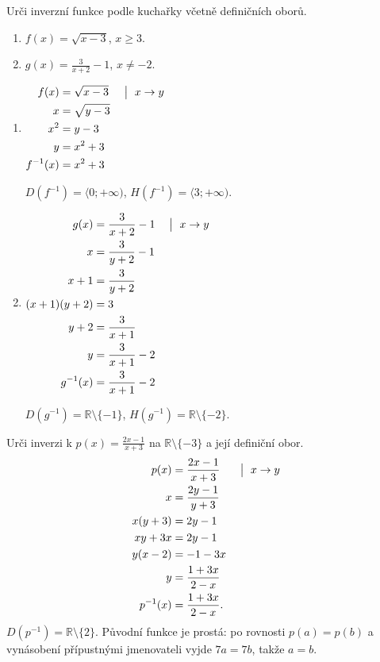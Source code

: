 \documentclass[11pt,a4paper]{article}
\begin{document}
\begin{zadaniReseniBox}[title={Samostatná práce 1}]
Urči inverzní funkce podle kuchařky včetně definičních oborů.
\begin{enumerate}[label=\alph*)]
\item $f(x)=\sqrt{x-3}$, $x\ge3$.
\item $g(x)=\frac{3}{x+2}-1$, $x\ne-2$.
\end{enumerate}
\tcblower
\begin{enumerate}[label=\alph*)]
\item
\(\displaystyle\begin{aligned}f(x)&=\sqrt{x-3} &&\bigm|\ x\to y\\x&=\sqrt{y-3}\\x^2&=y-3\\y&=x^2+3\\f^{-1}(x)&=x^2+3\end{aligned}\)

$D(f^{-1})=\langle0;+\infty)$, $H(f^{-1})=\langle3;+\infty)$.
\item
\(\displaystyle\begin{aligned}g(x)&=\frac{3}{x+2}-1 &&\bigm|\ x\to y\\x&=\frac{3}{y+2}-1\\x+1&=\frac{3}{y+2}\\(x+1)(y+2)&=3\\y+2&=\frac{3}{x+1}\\y&=\frac{3}{x+1}-2\\g^{-1}(x)&=\frac{3}{x+1}-2\end{aligned}\)

$D(g^{-1})=\mathbb R\setminus\{-1\}$, $H(g^{-1})=\mathbb R\setminus\{-2\}$.
\end{enumerate}
\end{zadaniReseniBox}

\begin{zadaniReseniBox}[title={Rozšíření 1}]
Urči inverzi k $p(x)=\frac{2x-1}{x+3}$ na $\mathbb R\setminus\{-3\}$ a její definiční obor.
\tcblower
\[
\begin{aligned}
p(x)&=\frac{2x-1}{x+3} &&\bigm|\ x\to y\\
x&=\frac{2y-1}{y+3}\\
x(y+3)&=2y-1\\
xy+3x&=2y-1\\
y(x-2)&=-1-3x\\
y&=\frac{1+3x}{2-x}\\
p^{-1}(x)&=\frac{1+3x}{2-x}.
\end{aligned}
\]
$D(p^{-1})=\mathbb R\setminus\{2\}$. Původní funkce je prostá: po rovnosti $p(a)=p(b)$ a vynásobení přípustnými jmenovateli vyjde $7a=7b$, takže $a=b$.
\end{zadaniReseniBox}
\end{document}
